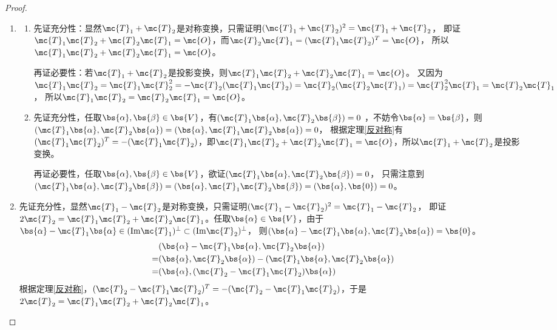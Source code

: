 \documentclass[12pt, a4paper, oneside, UTF8]{ctexbook}
\begin{document}
\begin{proof}
\begin{enumerate}[label=(\arabic*)]
        \item \begin{enumerate}
            \item 
            先证充分性：显然$\mc{T}_1+\mc{T}_2$是对称变换，只需证明$(\mc{T}_1+\mc{T}_2)^2=\mc{T}_1+\mc{T}_2$，
            即证$\mc{T}_1\mc{T}_2+\mc{T}_2\mc{T}_1=\mc{O}$，而$\mc{T}_2\mc{T}_1=(\mc{T}_1\mc{T}_2)^T=\mc{O}$，
            所以$\mc{T}_1\mc{T}_2+\mc{T}_2\mc{T}_1=\mc{O}$。
            
            再证必要性：若$\mc{T}_1+\mc{T}_2$是投影变换，则$\mc{T}_1\mc{T}_2+\mc{T}_2\mc{T}_1=\mc{O}$。
            又因为$\mc{T}_1\mc{T}_2=\mc{T}_1\mc{T}^2_2=-\mc{T}_2(\mc{T}_1\mc{T}_2)=\mc{T}_2(\mc{T}_2\mc{T}_1)=\mc{T}^2_2\mc{T}_1=\mc{T}_2\mc{T}_1$，
            所以$\mc{T}_1\mc{T}_2=\mc{T}_2\mc{T}_1=\mc{O}$。

            \item 先证充分性，任取$\bs{\alpha},\bs{\beta} \in \bs{V}$，有$(\mc{T}_1\bs{\alpha},\mc{T}_2\bs{\beta})=0$
        ，不妨令$\bs{\alpha}=\bs{\beta}$，则
        $
            (\mc{T}_1\bs{\alpha},\mc{T}_2\bs{\alpha}) 
            =(\bs{\alpha},\mc{T}_1\mc{T}_2\bs{\alpha})=0
        $，
        根据定理\ref{反对称}有$(\mc{T}_1\mc{T}_2)^T=-(\mc{T}_1\mc{T}_2)$，即$\mc{T}_1\mc{T}_2+\mc{T}_2\mc{T}_1=\mc{O}$，所以$\mc{T}_1+\mc{T}_2$是投影变换。

        再证必要性，任取$\bs{\alpha},\bs{\beta} \in \bs{V}$，欲证$(\mc{T}_1\bs{\alpha},\mc{T}_2\bs{\beta})=0$，
        只需注意到$(\mc{T}_1\bs{\alpha},\mc{T}_2\bs{\beta})=(\bs{\alpha},\mc{T}_1\mc{T}_2\bs{\beta})=(\bs{\alpha},\bs{0})=0$。
        \end{enumerate}
        \item 先证充分性，显然$\mc{T}_1-\mc{T}_2$是对称变换，只需证明$(\mc{T}_1-\mc{T}_2)^2=\mc{T}_1-\mc{T}_2$，
        即证$2\mc{T}_2=\mc{T}_1\mc{T}_2+\mc{T}_2\mc{T}_1$。任取$\bs{\alpha} \in \bs{V}$，由于$\bs{\alpha}-\mc{T}_1\bs{\alpha} \in (\mathrm{Im}\mc{T}_1)^{\perp} \subset (\mathrm{Im}\mc{T}_2)^{\perp} $，
        则$(\bs{\alpha}-\mc{T}_1\bs{\alpha},\mc{T}_2\bs{\alpha})=\bs{0}$。
        \begin{align*}
            &(\bs{\alpha}-\mc{T}_1\bs{\alpha},\mc{T}_2\bs{\alpha})\\
            =&(\bs{\alpha},\mc{T}_2 \bs{\alpha})-(\mc{T}_1\bs{\alpha},\mc{T}_2 \bs{\alpha}) \\
            =&(\bs{\alpha},(\mc{T}_2-\mc{T}_1\mc{T}_2 )\bs{\alpha}) 
        \end{align*}
        根据定理\ref{反对称}，$(\mc{T}_2-\mc{T}_1\mc{T}_2)^T=-(\mc{T}_2-\mc{T}_1\mc{T}_2)$，于是$2\mc{T}_2=\mc{T}_1\mc{T}_2+\mc{T}_2\mc{T}_1$。


\end{enumerate}
\end{proof}
\end{document}
